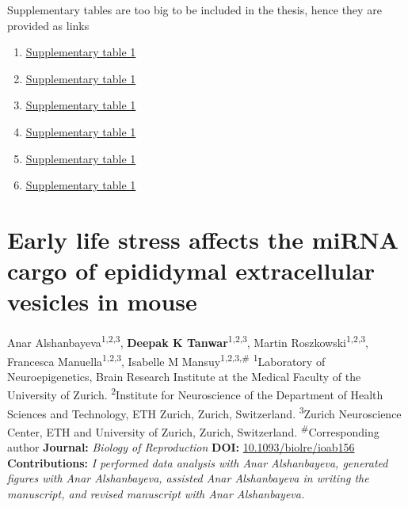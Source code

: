 \documentclass[12pt,twoside]{reedthesis}
\providecommand{\tightlist}{%
  \setlength{\itemsep}{0pt}\setlength{\parskip}{0pt}}
\begin{document}
Supplementary tables are too big to be included in the thesis, hence they are provided as links
\begin{enumerate}
\def\labelenumi{\arabic{enumi}.}
\tightlist
\item
  \href{../../figures/dev/t1.xlsx}{Supplementary table 1}
\item
  \href{../../figures/dev/t2.xlsx}{Supplementary table 1}
\item
  \href{../../figures/dev/t3.xlsx}{Supplementary table 1}
\item
  \href{../../figures/dev/t4.xlsx}{Supplementary table 1}
\item
  \href{../../figures/dev/t5.xlsx}{Supplementary table 1}
\item
  \href{../../figures/dev/t6.xlsx}{Supplementary table 1}
\end{enumerate}

\hypertarget{chapter2}{%
\chapter{Early life stress affects the miRNA cargo of epididymal extracellular vesicles in mouse}\label{chapter2}}

Anar Alshanbayeva\textsuperscript{1,2,3}, \textbf{Deepak K
Tanwar}\textsuperscript{1,2,3}, Martin
Roszkowski\textsuperscript{1,2,3}, Francesca
Manuella\textsuperscript{1,2,3}, Isabelle M
Mansuy\textsuperscript{1,2,3,\#} \newline \newline
\textsuperscript{1}Laboratory of Neuroepigenetics, Brain Research
Institute at the Medical Faculty of the University of Zurich. \newline
\textsuperscript{2}Institute for Neuroscience of the Department of
Health Sciences and Technology, ETH Zurich, Zurich, Switzerland.
\newline \textsuperscript{3}Zurich Neuroscience Center, ETH and
University of Zurich, Zurich, Switzerland. \newline \newline
\textsuperscript{\#}Corresponding author \newline \newline
\textbf{Journal:} \emph{Biology of Reproduction} \newline \newline 
\textbf{DOI:} \href{https://doi.org/10.1093/biolre/ioab156}{10.1093/biolre/ioab156}
\newline \newline
\textbf{Contributions:} \emph{I performed data analysis with Anar Alshanbayeva,
generated figures with Anar Alshanbayeva, assisted Anar Alshanbayeva in
writing the manuscript, and revised manuscript with Anar Alshanbayeva.}
\end{document}
